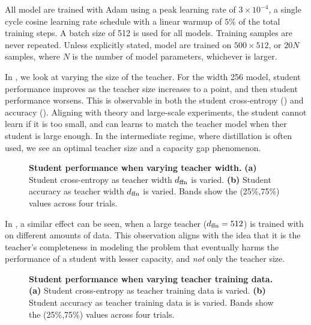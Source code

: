 All model are trained with Adam \citep{DBLP:journals/corr/KingmaB14}
using a peak learning rate of $3\times 10^{-4}$,
a single cycle cosine learning rate schedule with a linear warmup of $5\%$ of the total training steps.
A batch size of 512 is used for all models.
Training samples are never repeated.
Unless explicitly stated, model are trained on 
$500\times 512$, or $20N$ samples, where $N$ is the number of model parameters, whichever is larger.

In , we look at varying the size of the teacher.
For the width 256 model,
student performance improves as the teacher size increases to a point, and then student performance worsens.
This is observable in both the student cross-entropy () and accuracy ().
Aligning with theory and large-scale experiments, the student cannot learn if it is too small, and can learns to match the teacher model when ther student is large enough. In the intermediate regime, where distillation is often used, we see an optimal teacher size and a capacity gap phenomenon.

\begin{figure}[h]
	\centering
	\caption{\textbf{Student performance when varying teacher width.}
	\textbf{(a)} Student cross-entropy as teacher width $d_\text{ffn}$ is varied. 
	\textbf{(b)} Student accuracy as teacher width $d_\text{ffn}$ is varied.
    Bands show the (25\%,75\%) values across four trials.}
    \label{fig:student-teacher-size-remap-loss}
\end{figure}

In , a similar effect can be seen, when a large teacher ($d_\text{ffn}=512$) is trained with on different amounts of data. This observation aligns with the idea that it is the teacher's completeness in modeling the problem that eventually harms the performance of a student with lesser capacity, and \emph{not} only the teacher size.


\begin{figure}[h]
	\centering
	\caption{\textbf{Student performance when varying teacher training data.}
	\textbf{(a)} Student cross-entropy as teacher training data is varied. 
	\textbf{(b)} Student accuracy as teacher training data is is varied.
    Bands show the (25\%,75\%) values across four trials.}
    \label{fig:student-teacher-steps-remap-loss}
\end{figure}
